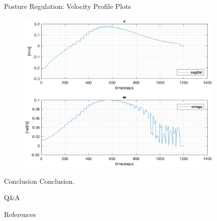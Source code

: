 \documentclass[10pt]{beamer}
\begin{document}
    \begin{frame}{Posture Regulation: Velocity Profile Plots}
        \begin{figure}
            \includegraphics[width=0.9\textwidth]{images/unicycle_velocities.png}
        \end{figure}
    \end{frame}

    \begin{frame}{Conclusion}
        Conclusion.
    \end{frame}

    \begin{frame}[standout]
        Q\&A
    \end{frame}

    \appendix

    \begin{frame}{References}
        
        
    \end{frame}
\end{document}
